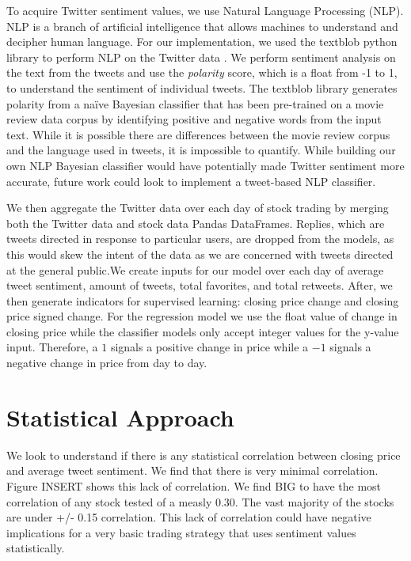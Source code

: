 \documentclass[../thesis.tex]{subfiles}
\begin{document}
To acquire Twitter sentiment values, we use Natural Language Processing (NLP). NLP is a branch of artificial intelligence that allows machines to understand and decipher human language. For our implementation, we used the textblob python library to perform NLP on the Twitter data \cite{Loria2018}. We perform sentiment analysis on the text from the tweets and use the \textit{polarity} score, which is a float from -1 to 1, to understand the sentiment of individual tweets. The textblob library generates polarity from a na\"{i}ve Bayesian classifier that has been pre-trained on a movie review data corpus by identifying positive and negative words from the input text. While it is possible there are differences between the movie review corpus and the language used in tweets, it is impossible to quantify. While building our own NLP Bayesian classifier would have potentially made Twitter sentiment more accurate, future work could look to implement a tweet-based NLP classifier. 

We then aggregate the Twitter data over each day of stock trading by merging both the Twitter data and stock data Pandas DataFrames. Replies, which are tweets directed in response to particular users, are dropped from the models, as this would skew the intent of the data as we are concerned with tweets directed at the general public.We create inputs for our model over each day of average tweet sentiment, amount of tweets, total favorites, and total retweets. After, we then generate indicators for supervised learning: closing price change and closing price signed change. For the regression model we use the float value of change in closing price while the classifier models only accept integer values for the y-value input. Therefore, a $1$ signals a positive change in price while a $-1$ signals a negative change in price from day to day.  

\section{Statistical Approach}
We look to understand if there is any statistical correlation between closing price and average tweet sentiment. We find that there is very minimal correlation. Figure INSERT shows this lack of correlation. We find BIG to have the most correlation of any stock tested of a measly 0.30. The vast majority of the stocks are under +/- 0.15 correlation. This lack of correlation could have negative implications for a very basic trading strategy that uses sentiment values statistically.
\end{document}
